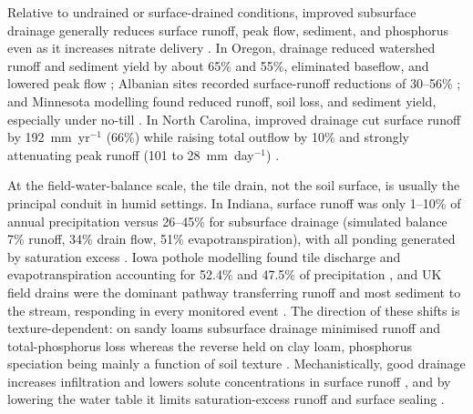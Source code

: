 \documentclass[11pt]{article}
\begin{document}
Relative to undrained or surface-drained conditions, improved subsurface drainage generally reduces surface runoff, peak flow, sediment, and phosphorus even as it increases nitrate delivery \parencite{FAUSEY1995,SKAGGS1994,THOMAS1995,Gramlich2018}. In Oregon, drainage reduced watershed runoff and sediment yield by about 65\% and 55\%, eliminated baseflow, and lowered peak flow \parencite{ISTOK1983}; Albanian sites recorded surface-runoff reductions of 30--56\% \parencite{Grazhdani1996}; and Minnesota modelling found reduced runoff, soil loss, and sediment yield, especially under no-till \parencite{Maalim2013}. In North Carolina, improved drainage cut surface runoff by 192~mm~yr$^{-1}$ (66\%) while raising total outflow by 10\% and strongly attenuating peak runoff (101 to 28~mm~day$^{-1}$) \parencite{KONYHA1992}.

At the field-water-balance scale, the tile drain, not the soil surface, is usually the principal conduit in humid settings. In Indiana, surface runoff was only 1--10\% of annual precipitation versus 26--45\% for subsurface drainage (simulated balance 7\% runoff, 34\% drain flow, 51\% evapotranspiration), with all ponding generated by saturation excess \parencite{Saadat2020}. Iowa pothole modelling found tile discharge and evapotranspiration accounting for 52.4\% and 47.5\% of precipitation \parencite{Amado2018,Martin2019}, and UK field drains were the dominant pathway transferring runoff and most sediment to the stream, responding in every monitored event \parencite{Deasy2009}. The direction of these shifts is texture-dependent: on sandy loams subsurface drainage minimised runoff and total-phosphorus loss whereas the reverse held on clay loam, phosphorus speciation being mainly a function of soil texture \parencite{Eastman2010}. Mechanistically, good drainage increases infiltration and lowers solute concentrations in surface runoff \parencite{Tong2016,Tao2017}, and by lowering the water table it limits saturation-excess runoff and surface sealing \parencite{Augeard2005}.

\printbibliography
\end{document}
